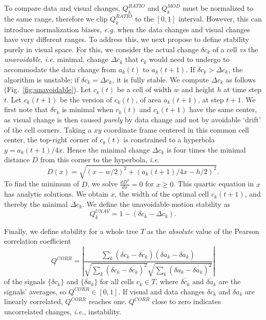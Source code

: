 To compare data and visual changes, $Q_k^{RATIO}$ and $Q_k^{MOD}$ must be normalized to the same range, therefore we clip $Q_k^{RATIO}$ to the $[0,1]$ interval. However, this can introduce normalization biases, \emph{e.g.} when the data changes and visual changes have very different ranges. To address this, we next propose to define stability purely in visual space. For this, we consider the actual change $\delta c_k$ of a cell \emph{vs} the \emph{unavoidable}, \emph{i.e.} minimal, change $\Delta c_k$ that $c_k$ would need to undergo to accommodate the data change from $a_k(t)$ to $a_k(t+1)$. If $\delta c_k > \Delta c_k$, the algorithm is unstable; if $\delta c_k = \Delta c_k$, it is fully stable. We compute $\Delta c_k$ as follows (Fig.~\ref{fig:unavoidable}). Let $c_k(t)$ be a cell of width $w$ and height $h$ at time step $t$. Let $c_k(t+1)$ be the version of $c_k(t)$, of area $a_k(t+1)$, at step $t+1$. We first note that $\delta c_k$ is minimal when $c_k(t)$ and $c_k(t+1)$ have the same center, as visual change is then caused \emph{purely} by data change and not by avoidable `drift' of the cell corners. Taking a $xy$ coordinate frame centered in this common cell center, the top-right corner of $c_k(t)$ is constrained to a hyperbola $y = a_k(t+1)/4x$. Hence the minimal change $\Delta c_k$ is four times the minimal distance $D$ from this corner to the hyperbola, \emph{i.e.}
%
\begin{equation}
D(x) = \sqrt{(x - w/2)^2 + (a_k(t+1)/4x - h/2)^2}. \nonumber
\end{equation}
%
To find the minimum of $D$, we solve $\frac{d D^2}{d x}=0$ for $x \geq 0$. This quartic equation in $x$ has analytic solutions. We obtain $x$, the width of the optimal cell $c_k(t+1)$, and thereby the minimal $\Delta c_k$. We define the unavoidable-motion stability as
%
\begin{equation}
Q^{UNAV}_k = 1 - (\delta c_k - \Delta c_k).
\end{equation}
%

Finally, we define stability for a whole tree $T$ as the \emph{absolute} value of the Pearson correlation coefficient
%
\begin{equation}
Q^{CORR} = \left| \frac{  \sum_k (\delta c_k - \overline{\delta c_k}) (\delta a_k - \overline{\delta a_k})  } {\sqrt { \sum_k (\delta c_k - \overline{\delta c_k})^2} \sqrt { \sum_k (\delta a_k - \overline{\delta a_k})^2}   }\right|
\label{eqn:pearson}
\end{equation}
%
of the signals $\{\delta c_k\}$ and $\{\delta a_k\}$ for all cells $c_k \in T$, where $\overline{\delta c_k}$ and $\overline{\delta a_k}$ are the signals' averages, so $Q^{CORR} \in [0,1]$. If visual and data changes $\delta c_k$ and $\delta a_k$ are linearly correlated, $Q^{CORR}$ reaches one. $Q^{CORR}$ close to zero indicates uncorrelated changes, \emph{i.e.}, instability.

